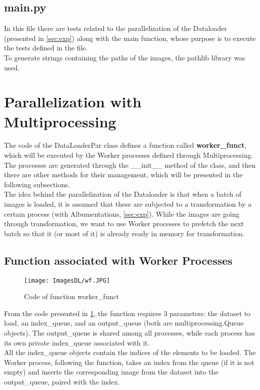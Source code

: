 \documentclass[10pt,twocolumn,letterpaper]{article}
\begin{document}
\subsection{main.py}
In this file there are tests related to the parallelization of the Dataloader (presented in \cref{sec:exp}) along with the main function, whose purpose is to execute the tests defined in the file.\\
To generate strings containing the paths of the images, the pathlib library was used.


\section{Parallelization with Multiprocessing}
\label{sec:par}
The code of the DataLoaderPar class defines a function called \textbf{worker\_funct}, which will be executed by the Worker processes defined through Multiprocessing.\\
The processes are generated through the \_\_init\_\_ method of the class, and then there are other methods for their management, which will be presented in the following subsections.\\
The idea behind the parallelization of the Dataloader is that when a batch of images is loaded, it is assumed that these are subjected to a transformation by a certain process (with Albumentations, \cref{sec:exp}). While the images are going through transformation, we want to use Worker processes to prefetch the next batch so that it (or most of it) is already ready in memory for transformation.

\subsection{Function associated with Worker Processes}
\label{sec:fw}

\begin{figure}[h]
    \centering
    \texttt{[image: ImagesDL/wf.JPG]}
    \caption{Code of function worker\_funct}
    \label{fig:wf}
\end{figure}


From the code presented in \cref{fig:wf}, the function requires 3 parameters: the dataset to load, an index\_queue, and an output\_queue (both are multiprocessing.Queue objects). The output\_queue is shared among all processes, while each process has its own private index\_queue associated with it.\\
All the index\_queue objects contain the indices of the elements to be loaded. The Worker process, following the function, takes an index from the queue (if it is not empty) and inserts the corresponding image from the dataset into the output\_queue, paired with the index.
\end{document}
